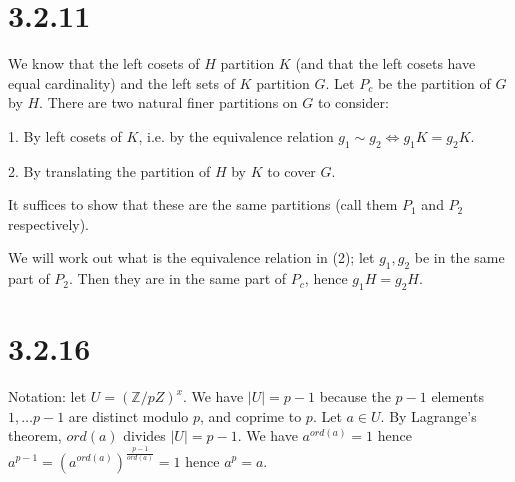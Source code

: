 \documentclass{article}
\def\Z{\mathbb{Z}}
\begin{document}
\section*{3.2.11}

We know that the left cosets of $H$ partition $K$ (and that the left cosets have equal cardinality) and the left sets of $K$ partition $G$. Let $P_c$ be the partition of $G$ by $H$. There are two natural finer partitions on $G$ to consider:

1. By left cosets of $K$, i.e. by the equivalence relation $g_1 \sim g_2 \iff g_1 K = g_2 K$.

2. By translating the partition of $H$ by $K$ to cover $G$.

It suffices to show that these are the same partitions (call them $P_1$ and $P_2$ respectively).

We will work out what is the equivalence relation in (2); let $g_1, g_2$ be in the same part of $P_2$. Then they are in the same part of $P_c$, hence $g_1 H = g_2 H$.




\section*{3.2.16}

Notation: let $U = (\Z/pZ)^x$. We have $|U| = p-1$ because the $p-1$ elements $1, \ldots p-1$ are distinct modulo $p$, and coprime to $p$. Let $a \in U$. By Lagrange's theorem, $ord(a)$ divides $|U| = p-1$. We have $a^{ord(a)} = 1$ hence $a^{p-1} = (a^{ord(a)})^{\frac{p-1}{ord(a)}} = 1$ hence $a^p = a$.

\end{document}
